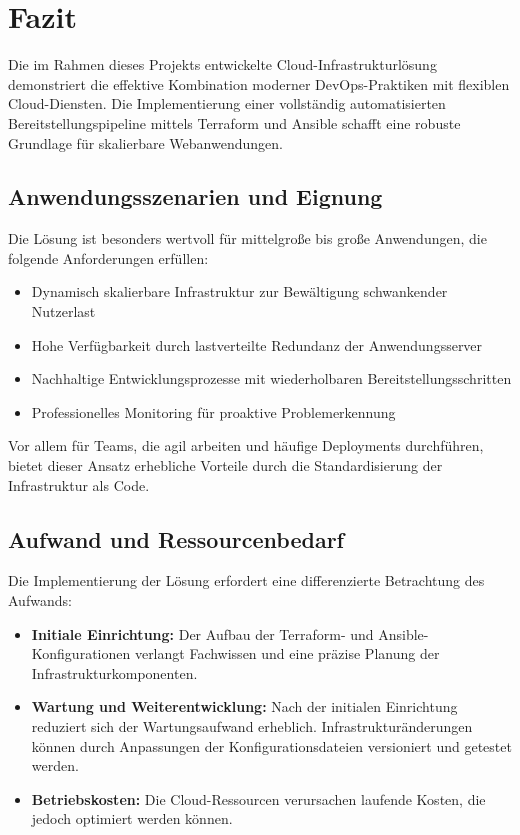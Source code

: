 \chapter{Fazit}

Die im Rahmen dieses Projekts entwickelte Cloud-Infrastrukturlösung demonstriert die effektive Kombination moderner DevOps-Praktiken mit flexiblen Cloud-Diensten. Die Implementierung einer vollständig automatisierten Bereitstellungspipeline mittels Terraform und Ansible schafft eine robuste Grundlage für skalierbare Webanwendungen.

\section{Anwendungsszenarien und Eignung}

Die Lösung ist besonders wertvoll für mittelgroße bis große Anwendungen, die folgende Anforderungen erfüllen:

\begin{itemize}
    \item Dynamisch skalierbare Infrastruktur zur Bewältigung schwankender Nutzerlast
    \item Hohe Verfügbarkeit durch lastverteilte Redundanz der Anwendungsserver
    \item Nachhaltige Entwicklungsprozesse mit wiederholbaren Bereitstellungsschritten
    \item Professionelles Monitoring für proaktive Problemerkennung
\end{itemize}

Vor allem für Teams, die agil arbeiten und häufige Deployments durchführen, bietet dieser Ansatz erhebliche Vorteile durch die Standardisierung der Infrastruktur als Code.

\section{Aufwand und Ressourcenbedarf}

Die Implementierung der Lösung erfordert eine differenzierte Betrachtung des Aufwands:

\begin{itemize}
    \item \textbf{Initiale Einrichtung:} Der Aufbau der Terraform- und Ansible-Konfigurationen verlangt Fachwissen und eine präzise Planung der Infrastrukturkomponenten.
    \item \textbf{Wartung und Weiterentwicklung:} Nach der initialen Einrichtung reduziert sich der Wartungsaufwand erheblich. Infrastrukturänderungen können durch Anpassungen der Konfigurationsdateien versioniert und getestet werden.
    \item \textbf{Betriebskosten:} Die Cloud-Ressourcen verursachen laufende Kosten, die jedoch optimiert werden können.
\end{itemize}

